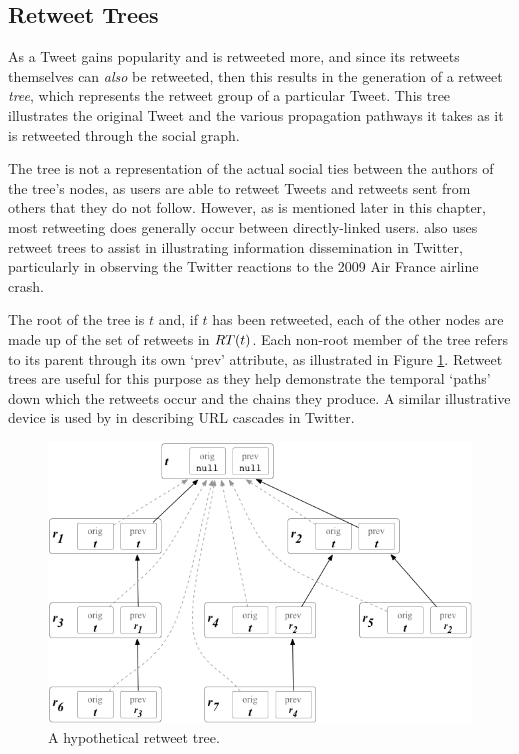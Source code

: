 \subsection{Retweet Trees}
As a Tweet gains popularity and is retweeted more, and since its retweets themselves can \textit{also} be retweeted, then this results in the generation of a retweet \textit{tree}, which represents the retweet group of a particular Tweet. This tree illustrates the original Tweet and the various propagation pathways it takes as it is retweeted through the social graph. 

The tree is not a representation of the actual social ties between the authors of the tree's nodes, as users are able to retweet Tweets and retweets sent from others that they do not follow. However, as is mentioned later in this chapter, most retweeting does generally occur between directly-linked users. \cite{kwak10} also uses retweet trees to assist in illustrating information dissemination in Twitter, particularly in observing the Twitter reactions to the 2009 Air France airline crash.

The root of the tree is $t$ and, if $t$ has been retweeted, each of the other nodes are made up of the set of retweets in $RT(t)$. Each non-root member of the tree refers to its parent through its own `$\textrm{prev}$' attribute, as illustrated in Figure \ref{fig:retweet_tree}. Retweet trees are useful for this purpose as they help demonstrate the temporal `paths' down which the retweets occur and the chains they produce. A similar illustrative device is used by \citet{galuba10} in describing URL cascades in Twitter.

\begin{figure}[h]
\centering
\includegraphics[scale=0.6]{3.Chapter1/Media/tree.png} 
\caption{A hypothetical retweet tree.}
\label{fig:retweet_tree}
\end{figure}

